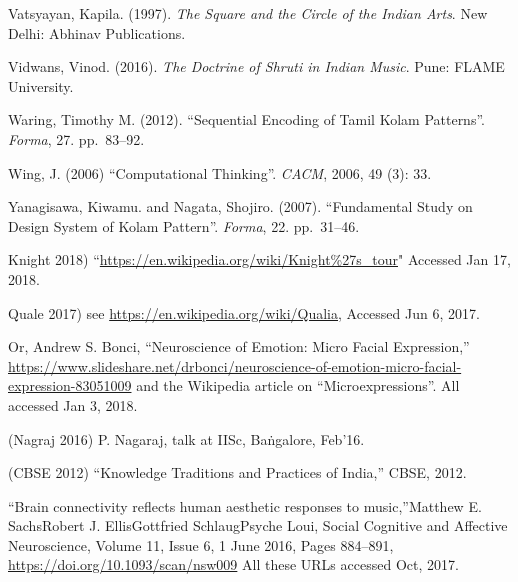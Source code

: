 \begin{thebibliography}{99}
Vatsyayan, Kapila. (1997). \textsl{The Square and the Circle of the Indian Arts}. New Delhi: Abhinav Publications.

Vidwans, Vinod. (2016). \textsl{The Doctrine of Shruti in Indian Music}. Pune: FLAME University.

Waring, Timothy M. (2012). “Sequential Encoding of Tamil Kolam Patterns”. \textsl{Forma}, 27. pp.~83--92.

Wing, J. (2006) “Computational Thinking”. \textsl{CACM}, 2006, 49 (3): 33.

Yanagisawa, Kiwamu. and Nagata, Shojiro. (2007). “Fundamental Study on Design System of Kolam Pattern”. \textsl{Forma}, 22. pp.~31--46.

Knight 2018) “\url{https://en.wikipedia.org/wiki/Knight%27s_tour}" 
Accessed Jan 17, 2018.

Quale 2017) see \url{https://en.wikipedia.org/wiki/Qualia}, Accessed Jun 6, 2017.

Or, Andrew S. Bonci, “Neuroscience of Emotion: Micro Facial Expression,” \url{https://www.slideshare.net/drbonci/neuroscience-of-emotion-micro-facial-expression-83051009} and the Wikipedia article on “Microexpressions”. All accessed Jan 3, 2018.

(Nagraj 2016) P. Nagaraj, talk at IISc, Baṅgalore, Feb’16.

(CBSE 2012) “Knowledge Traditions and Practices of India,” CBSE, 2012.

“Brain connectivity reflects human aesthetic responses to music,”Matthew E. SachsRobert J. EllisGottfried SchlaugPsyche Loui, Social Cognitive and Affective Neuroscience, Volume 11, Issue 6, 1 June 2016, Pages 884--891, \url{https://doi.org/10.1093/scan/nsw009} All these URLs accessed Oct, 2017.
\end{thebibliography}

\theendnotes

